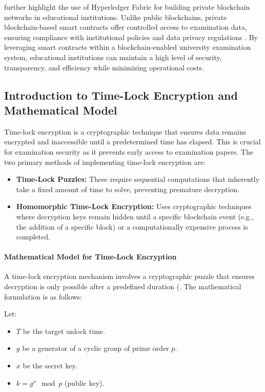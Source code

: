 \documentclass[12pt,a4paper]{article}
\begin{document}
\cite{samanta2021blockchain} further highlight the use of Hyperledger Fabric for building private blockchain networks in educational institutions. Unlike public blockchains, private blockchain-based smart contracts offer controlled access to examination data, ensuring compliance with institutional policies and data privacy regulations \cite{https://doi.org/10.1002/spy2.283} \cite{7546538}. By leveraging smart contracts within a blockchain-enabled university examination system, educational institutions can maintain a high level of security, transparency, and efficiency while minimizing operational costs.

\subsection{Introduction to Time-Lock Encryption and Mathematical Model}
Time-lock encryption is a cryptographic technique that ensures data remains encrypted and inaccessible until a predetermined time has elapsed. This is crucial for examination security as it prevents early access to examination papers. The two primary methods of implementing time-lock encryption are:
\begin{itemize}
    \item \textbf{Time-Lock Puzzles:} These require sequential computations that inherently take a fixed amount of time to solve, preventing premature decryption.
    \item \textbf{Homomorphic Time-Lock Encryption:} Uses cryptographic techniques where decryption keys remain hidden until a specific blockchain event (e.g., the addition of a specific block) or a computationally expensive process is completed.
\end{itemize}

\paragraph{Mathematical Model for Time-Lock Encryption}
A time-lock encryption mechanism involves a cryptographic puzzle that ensures decryption is only possible after a predefined duration (\cite{liu2018build}. The mathematical formulation is as follows:

Let:
\begin{itemize}
    \item $T$ be the target unlock time.
    \item $g$ be a generator of a cyclic group of prime order $p$.
    \item $x$ be the secret key.
    \item $k = g^x \mod p$ (public key).
\end{itemize}
\end{document}
